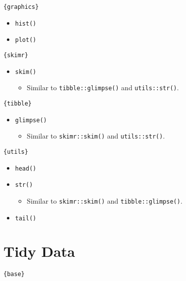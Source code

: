 \documentclass[
]{book}
\providecommand{\tightlist}{%
  \setlength{\itemsep}{0pt}\setlength{\parskip}{0pt}}
\begin{document}
\texttt{\{graphics\}}

\begin{itemize}
\tightlist
\item
  \texttt{hist()}
\item
  \texttt{plot()}
\end{itemize}

\texttt{\{skimr\}}

\begin{itemize}
\tightlist
\item
  \texttt{skim()}

  \begin{itemize}
  \tightlist
  \item
    Similar to \texttt{tibble::glimpse()} and \texttt{utils::str()}.
  \end{itemize}
\end{itemize}

\texttt{\{tibble\}}

\begin{itemize}
\tightlist
\item
  \texttt{glimpse()}

  \begin{itemize}
  \tightlist
  \item
    Similar to \texttt{skimr::skim()} and \texttt{utils::str()}.
  \end{itemize}
\end{itemize}

\texttt{\{utils\}}

\begin{itemize}
\tightlist
\item
  \texttt{head()}
\item
  \texttt{str()}

  \begin{itemize}
  \tightlist
  \item
    Similar to \texttt{skimr::skim()} and \texttt{tibble::glimpse()}.
  \end{itemize}
\item
  \texttt{tail()}
\end{itemize}

\hypertarget{tidy-data}{%
\section{Tidy Data}\label{tidy-data}}

\texttt{\{base\}}
\end{document}
